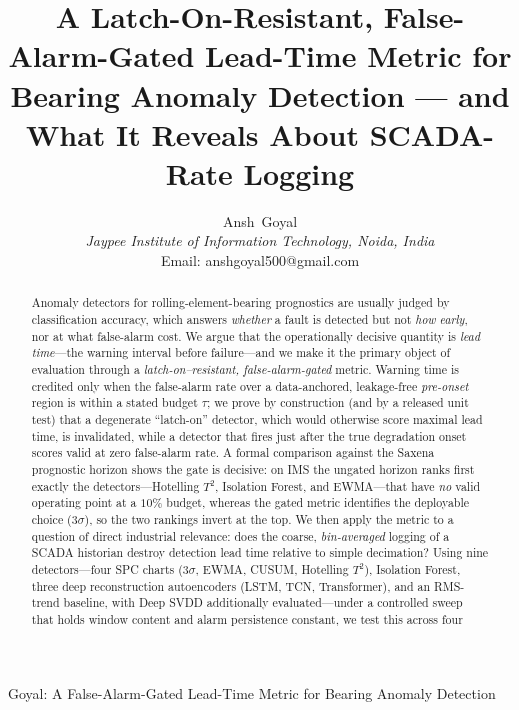 \documentclass[journal]{IEEEtran}
\begin{document}
\title{A Latch-On-Resistant, False-Alarm-Gated Lead-Time Metric for Bearing
Anomaly Detection --- and What It Reveals About SCADA-Rate Logging}

\author{Ansh~Goyal\\
\textit{Jaypee Institute of Information Technology, Noida, India}\\
Email: anshgoyal500@gmail.com}

%
{Goyal: A False-Alarm-Gated Lead-Time Metric for Bearing Anomaly Detection}

\maketitle

\begin{abstract}
Anomaly detectors for rolling-element-bearing prognostics are usually judged by
classification accuracy, which answers \emph{whether} a fault is detected but not
\emph{how early}, nor at what false-alarm cost. We argue that the operationally
decisive quantity is \emph{lead time}---the warning interval before failure---and
we make it the primary object of evaluation through a \emph{latch-on--resistant,
false-alarm-gated} metric. Warning time is credited only when the false-alarm rate
over a data-anchored, leakage-free \emph{pre-onset} region is within a stated
budget $\tau$; we prove by construction (and by a released unit test) that a
degenerate ``latch-on'' detector, which would otherwise score maximal lead time,
is invalidated, while a detector that fires just after the true degradation onset
scores valid at zero false-alarm rate. A formal comparison against the Saxena
prognostic horizon shows the gate is decisive: on IMS the ungated horizon ranks
first exactly the detectors---Hotelling $T^2$, Isolation Forest, and EWMA---that
have \emph{no} valid operating point at a $10\%$ budget, whereas the gated metric
identifies the deployable choice (3$\sigma$), so the two rankings invert at the
top. We then apply the metric to a question of direct industrial relevance: does
the coarse, \emph{bin-averaged} logging of a SCADA historian destroy detection
lead time relative to simple decimation? Using nine detectors---four SPC charts
(3$\sigma$, EWMA, CUSUM, Hotelling $T^2$), Isolation Forest, three deep
reconstruction autoencoders (LSTM, TCN, Transformer), and an RMS-trend
baseline, with Deep SVDD additionally evaluated---under a controlled sweep that
holds window content and alarm persistence constant, we test this across four

\end{abstract}
\end{document}
